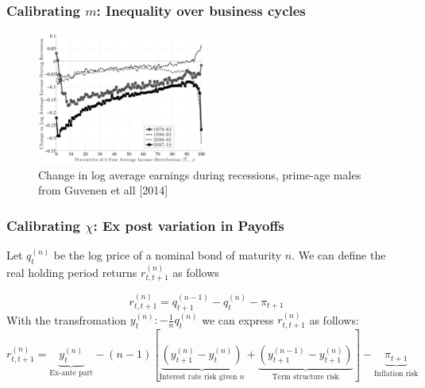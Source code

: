 \documentclass{beamer}
\begin{document}
\begin{frame}	
\frametitle{Calibrating $m$: Inequality over business cycles}


 {
  \begin{figure}
  \label{fig:fatih_picture}
    \centering
    \includegraphics[width = 0.5\textwidth]{fg13.jpeg}
    \caption{ Change in log average earnings during recessions, prime-age males from Guvenen et all [2014]}
  \end{figure}

}
\end{frame}



\begin{frame}
 \frametitle{Calibrating $\chi$: Ex post variation in Payoffs}
 Let $q^{(n)}_t$ be the log price of a nominal bond of maturity $n$. We can define the real holding period returns $r^{(n)}_{t,t+1}$ as follows
 
 \[r^{(n)}_{t,t+1}= q^{(n-1)}_{t+1}-q_t^{(n)}-\pi_{t+1}\]
 With the transfromation $y^{(n)}_t: -\frac{1}{n} q^{(n)}_t$ we can express $r^{(n)}_{t,t+1}$ as follows:
 \small
 \[r^{(n)}_{t,t+1}=\underbrace{y^{(n)}_t}_{\text{Ex-ante part}} - (n-1)\left[\underbrace{\left(y^{(n)}_{t+1}-y^{(n)}_{t}\right)}_{\text{Interest rate risk given $n$}}+\underbrace{\left(y^{(n-1)}_{t+1}-y^{(n)}_{t+1}\right)}_{\text{Term structure risk}}\right]-\underbrace{\pi_{t+1}}_{\text{Inflation risk}}\]
\end{frame}
\end{document}
